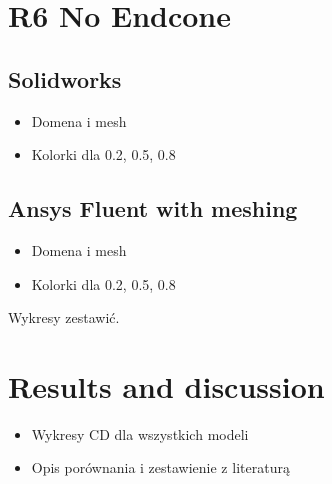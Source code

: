 \documentclass{article}
\begin{document}
\section{R6 No Endcone}
\subsection{Solidworks}
\begin{itemize}
    \item Domena i mesh
    \item Kolorki dla 0.2, 0.5, 0.8
\end{itemize}
\subsection{Ansys Fluent with meshing}
\begin{itemize}
    \item Domena i mesh
    \item Kolorki dla 0.2, 0.5, 0.8
\end{itemize}
Wykresy zestawić.

\section{Results and discussion}
\begin{itemize}
    \item Wykresy CD dla wszystkich modeli
    \item Opis porównania i zestawienie z literaturą
\end{itemize}
\end{document}

